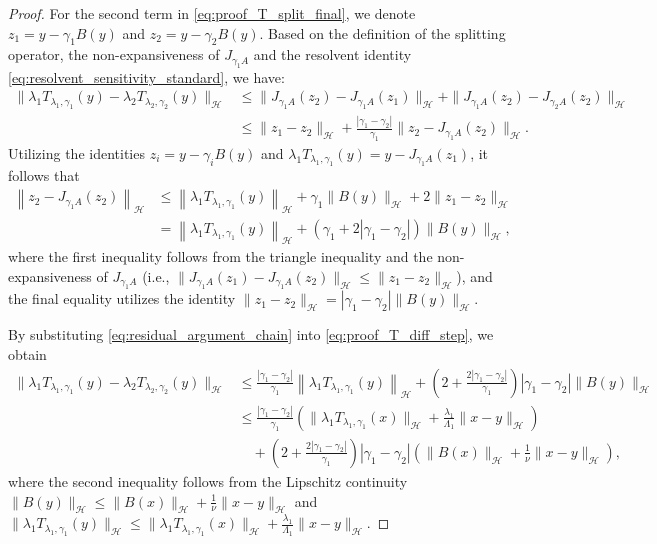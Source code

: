 \documentclass{article}
\theoremstyle{definition}
\theoremstyle{definition}
\theoremstyle{definition}
\begin{document}
\begin{proof}
\noindent For the second term in \eqref{eq:proof_T_split_final}, we denote $z_{1} = y - \gamma_{1} B(y)$ and $z_{2} = y - \gamma_{2} B(y)$. Based on the definition of the splitting operator, the non-expansiveness of $J_{\gamma_1 A}$ and the resolvent identity \eqref{eq:resolvent_sensitivity_standard}, we have:
\begin{align}
\|\lambda_1 T_{\lambda_1, \gamma_1}(y) - \lambda_2 T_{\lambda_2, \gamma_2}(y)\|_{\mathcal{H}} &\leq \| J_{\gamma_1 A}(z_2) - J_{\gamma_1 A}(z_1) \|_{\mathcal{H}} + \| J_{\gamma_1 A}(z_2) - J_{\gamma_2 A}(z_2) \|_{\mathcal{H}} \nonumber \\
&\leq \| z_1 - z_2 \|_{\mathcal{H}} + \frac{|\gamma_1 - \gamma_2|}{\gamma_1} \| z_2 - J_{\gamma_1 A}(z_2) \|_{\mathcal{H}}.
\label{eq:proof_T_diff_step}
\end{align}
Utilizing the identities $z_{i} = y - \gamma_{i} B(y)$ and $\lambda_{1} T_{\lambda_{1}, \gamma_{1}}(y) = y - J_{\gamma_{1} A}(z_{1})$, it follows that
\begin{align}
\left\| z_{2} - J_{\gamma_{1} A}(z_{2}) \right\|_{\mathcal{H}} 
&\le \left\| \lambda_{1} T_{\lambda_{1}, \gamma_{1}}(y) \right\|_{\mathcal{H}} + \gamma_{1} \| B(y) \|_{\mathcal{H}} + 2 \| z_{1} - z_{2} \|_{\mathcal{H}} \nonumber \\
&= \left\| \lambda_{1} T_{\lambda_{1}, \gamma_{1}}(y) \right\|_{\mathcal{H}} + \left( \gamma_{1} + 2 \left| \gamma_{1} - \gamma_{2} \right| \right) \| B(y) \|_{\mathcal{H}}, \label{eq:residual_argument_chain}
\end{align}
where the first inequality follows from the triangle inequality and the non-expansiveness of $J_{\gamma_1 A}$ (i.e., $\| J_{\gamma_1 A}(z_1) - J_{\gamma_1 A}(z_2) \|_{\mathcal{H}} \le \| z_1 - z_2 \|_{\mathcal{H}}$), and the final equality utilizes the identity $\|z_1 - z_2\|_{\mathcal{H}} = |\gamma_1 - \gamma_2| \|B(y)\|_{\mathcal{H}}$.

\noindent By substituting \eqref{eq:residual_argument_chain} into \eqref{eq:proof_T_diff_step}, we obtain
\begin{align}
\|\lambda_1 T_{\lambda_1, \gamma_1}(y) - \lambda_2 T_{\lambda_2, \gamma_2}(y)\|_{\mathcal{H}} &\le \frac{|\gamma_1 - \gamma_2|}{\gamma_1} \left\| \lambda_1 T_{\lambda_1, \gamma_1}(y) \right\|_{\mathcal{H}} + \left( 2 + \frac{2|\gamma_1 - \gamma_2|}{\gamma_1} \right) |\gamma_1 - \gamma_2| \|B(y)\|_{\mathcal{H}} \nonumber \\
&\le \frac{|\gamma_1 - \gamma_2|}{\gamma_1} \left( \|\lambda_1 T_{\lambda_1, \gamma_1}(x)\|_{\mathcal{H}} + \frac{\lambda_1}{\Lambda_1} \|x - y\|_{\mathcal{H}} \right) \nonumber \\
&\quad + \left( 2 + \frac{2|\gamma_1 - \gamma_2|}{\gamma_1} \right) |\gamma_1 - \gamma_2| \left( \|B(x)\|_{\mathcal{H}} + \frac{1}{\nu} \|x - y\|_{\mathcal{H}} \right), \label{eq:y_residual_combined_chain}
\end{align}
where the second inequality follows from the Lipschitz continuity $\|B(y)\|_{\mathcal{H}} \leq \|B(x)\|_{\mathcal{H}} + \frac{1}{\nu} \|x - y\|_{\mathcal{H}}$ and $\|\lambda_1 T_{\lambda_1, \gamma_1}(y)\|_{\mathcal{H}} \leq \|\lambda_1 T_{\lambda_1, \gamma_1}(x)\|_{\mathcal{H}} + \frac{\lambda_1}{\Lambda_1} \|x - y\|_{\mathcal{H}}$.


\end{proof}
\end{document}
